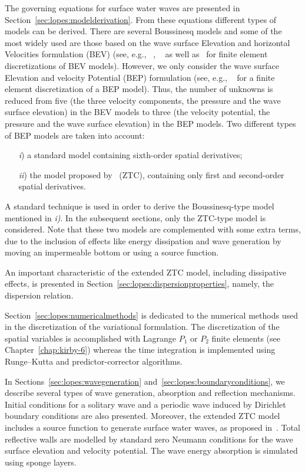 The governing equations for surface water waves are
presented in Section~\ref{sec:lopes:modelderivation}. From
these equations different types of models can be derived.
There are several Boussinesq models and some of the most
widely used are those based on the wave surface Elevation
and horizontal Velocities formulation (BEV) (see, e.g.,
~\citet{WalkleyBerzins2002}, ~\citet{WooLiu2004a} as well
as~\citet{WooLiu2004b} for finite element discretizations of
BEV models).  However, we only consider the wave
surface Elevation and velocity Potential (BEP) formulation
(see, e.g., ~\citet{LangtangenPedersen1998} for a finite
element discretization of a BEP model).  Thus, the number of
unknowns is reduced from five (the three velocity
components, the pressure and the wave surface elevation) in
the BEV models to three (the velocity potential, the
pressure and the wave surface elevation) in the BEP models.
Two different types of BEP models are taken into account:
\begin{itemize}
\item[{\it i})] a standard  model containing sixth-order
  spatial derivatives;
\item[{\it ii})] the  model proposed
by~\citet{ZhaoTengCheng2004} (ZTC),
 containing only first and second-order spatial derivatives.
\end{itemize}
A standard technique is used in order to derive the
Boussinesq-type model mentioned in {\it i)}.  In the
subsequent sections, only the ZTC-type model is considered.
Note that these two models are complemented with some extra
terms, due to the inclusion of effects like energy
dissipation
and wave generation by moving
an impermeable bottom or using a source function.

An important characteristic of the extended ZTC model,
including dissipative effects, is presented in
Section~\ref{sec:lopes:dispersionproperties}, namely, the
dispersion relation.

Section~\ref{sec:lopes:numericalmethods} is dedicated to the
numerical methods used in the discretization of the
variational formulation.  The discretization of the spatial
variables is accomplished with Lagrange $P_1$ or $P_2$
finite elements (see Chapter~\ref{chap:kirby-6}) whereas the
time integration is implemented using Runge--Kutta and
predictor-corrector algorithms.


In Sections~\ref{sec:lopes:wavegeneration}
and~\ref{sec:lopes:boundaryconditions}, we describe several
types of wave generation, absorption and reflection
mechanisms.  Initial conditions for a solitary wave and a
periodic wave induced by Dirichlet boundary conditions are
also presented.  Moreover, the extended ZTC model includes a
source function to generate surface water waves, as proposed
in~\citet{WeiKirbySinha1999}.  Total reflective walls are
modelled by standard zero Neumann conditions for the wave
surface elevation and velocity potential.  The wave energy
absorption is simulated using sponge layers.

